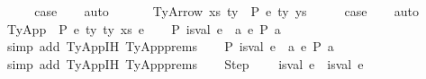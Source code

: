 \begin{isabellebody}
\ \ \isamarkupfalse%
\ \isamarkupfalse%
\ {\isacharquery}{\kern0pt}case\isanewline
\ \ \isamarkupfalse%
\ auto\isanewline
\ \ \isamarkupfalse%
\isanewline
{}\isamarkupfalse%
\isanewline
\ \ \isamarkupfalse%
\ {\isacharparenleft}{\kern0pt}TyArrow\ xs\ ty{}\ {\isasymGamma}\ P\ e\ ty{}\ ys{\isacharparenright}{\kern0pt}\isanewline
\ \ \isamarkupfalse%
\ \isamarkupfalse%
\ {\isacharquery}{\kern0pt}case\isanewline
\ \ \isamarkupfalse%
\ auto\isanewline
\ \ \isamarkupfalse%
\isanewline
{}\isamarkupfalse%
\isanewline
\ \ \isamarkupfalse%
\ {\isacharparenleft}{\kern0pt}TyApp\ {\isasymGamma}\ P\ e{}\ ty{}\ ty{}\ xs\ e{}{\isacharparenright}{\kern0pt}\isanewline
\ \ \isamarkupfalse%
\ P{}{\isacharcolon}{\kern0pt}\ {\isachardoublequoteopen}is{\isacharunderscore}{\kern0pt}val\ e{}\ {\isasymor}\ {\isacharparenleft}{\kern0pt}{\isasymexists}a{\isachardot}{\kern0pt}\ e{}\ {\isacharminus}{\kern0pt}{\isachargreater}{\kern0pt}{\isacharbraceleft}{\kern0pt}P{\isacharbraceright}{\kern0pt}\ a{\isacharparenright}{\kern0pt}{\isachardoublequoteclose}\isanewline
\ \ \ \ \isamarkupfalse%
\ {\isacharparenleft}{\kern0pt}simp\ add{\isacharcolon}{\kern0pt}\ TyApp{\isachardot}{\kern0pt}IH{\isacharparenleft}{\kern0pt}{}{\isacharparenright}{\kern0pt}\ TyApp{\isachardot}{\kern0pt}prems{\isacharparenright}{\kern0pt}\isanewline
\ \ \isamarkupfalse%
\ P{}{\isacharcolon}{\kern0pt}\ {\isachardoublequoteopen}is{\isacharunderscore}{\kern0pt}val\ e{}\ {\isasymor}\ {\isacharparenleft}{\kern0pt}{\isasymexists}a{\isachardot}{\kern0pt}\ e{}\ {\isacharminus}{\kern0pt}{\isachargreater}{\kern0pt}{\isacharbraceleft}{\kern0pt}P{\isacharbraceright}{\kern0pt}\ a{\isacharparenright}{\kern0pt}{\isachardoublequoteclose}\isanewline
\ \ \ \ \isamarkupfalse%
\ {\isacharparenleft}{\kern0pt}simp\ add{\isacharcolon}{\kern0pt}\ TyApp{\isachardot}{\kern0pt}IH{\isacharparenleft}{\kern0pt}{}{\isacharparenright}{\kern0pt}\ TyApp{\isachardot}{\kern0pt}prems{\isacharparenright}{\kern0pt}\isanewline
\isanewline
\ \ \isamarkupfalse%
\ Step{\isacharcolon}{\kern0pt}\isanewline
\ \ \ \ {\isachardoublequoteopen}{\isacharparenleft}{\kern0pt}is{\isacharunderscore}{\kern0pt}val\ e{}\ {\isasymand}\ is{\isacharunderscore}{\kern0pt}val\ e{}{\isacharparenright}{\kern0pt}\ {\isasymor}\isanewline

\end{isabellebody}
